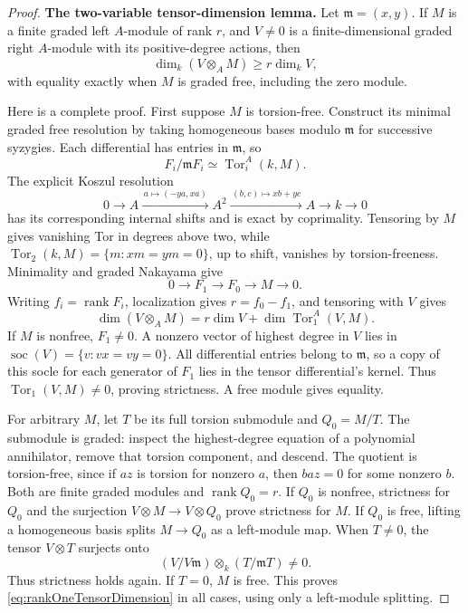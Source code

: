 \documentclass[11pt,a4paper]{article}
\theoremstyle{named}\newtheorem{finding}{Finding}[section]
\theoremstyle{definition}\newtheorem{definition}[finding]{Definition}
\theoremstyle{remark}\newtheorem{remark}[finding]{Remark}
\begin{document}
\begin{proof}
\par\smallskip\noindent\textbf{The two-variable tensor-dimension lemma.}\quad
Let \(\mathfrak m=(x,y)\). If \(M\) is a finite graded
left \(A\)-module of rank \(r\), and \(V\ne0\) is a
finite-dimensional graded right \(A\)-module with its
positive-degree actions, then
\begin{equation}\label{eq:rankOneTensorDimension}
 \dim_k(V\otimes_AM)\ge r\dim_kV,
\end{equation}
with equality exactly when \(M\) is graded free,
including the zero module.

Here is a complete proof. First suppose \(M\) is
torsion-free. Construct its minimal graded free
resolution by taking homogeneous bases modulo
\(\mathfrak m\) for successive syzygies. Each differential
has entries in \(\mathfrak m\), so
\[
 F_i/\mathfrak mF_i\simeq\operatorname{Tor}_i^A(k,M).
\]
The explicit Koszul resolution
\[
 0\longrightarrow A
 \xrightarrow{\,a\mapsto(-ya,xa)\,}A^2
 \xrightarrow{\,(b,c)\mapsto xb+yc\,}A
 \longrightarrow k\longrightarrow0
\]
has its corresponding internal shifts and is exact
by coprimality. Tensoring by \(M\) gives vanishing
Tor in degrees above two, while
\(\operatorname{Tor}_2(k,M)=\{m:xm=ym=0\}\), up to
shift, vanishes by torsion-freeness.
Minimality and graded Nakayama give
\[
 0\longrightarrow F_1\longrightarrow F_0
       \longrightarrow M\longrightarrow0.
\]
Writing \(f_i=\operatorname{rank}F_i\), localization
gives \(r=f_0-f_1\), and tensoring with \(V\) gives
\begin{equation}\label{eq:rankOneTorDimension}
 \dim(V\otimes_AM)
 =r\dim V+\dim\operatorname{Tor}_1^A(V,M).
\end{equation}
If \(M\) is nonfree, \(F_1\ne0\).
A nonzero vector of highest degree in \(V\) lies in
\(\operatorname{soc}(V)=\{v:vx=vy=0\}\).
All differential entries belong to \(\mathfrak m\),
so a copy of this socle for each generator of \(F_1\)
lies in the tensor differential's kernel.
Thus \(\operatorname{Tor}_1(V,M)\ne0\), proving
strictness. A free module gives equality.

For arbitrary \(M\), let \(T\) be its full torsion
submodule and \(Q_0=M/T\). The submodule is graded:
inspect the highest-degree equation of a polynomial
annihilator, remove that torsion component, and descend.
The quotient is torsion-free, since if \(az\) is
torsion for nonzero \(a\), then \(baz=0\) for some
nonzero \(b\). Both are finite graded modules and
\(\operatorname{rank}Q_0=r\).
If \(Q_0\) is nonfree, strictness for \(Q_0\) and
the surjection \(V\otimes M\to V\otimes Q_0\) prove
strictness for \(M\).
If \(Q_0\) is free, lifting a homogeneous basis
splits \(M\to Q_0\) as a left-module map.
When \(T\ne0\), the tensor \(V\otimes T\) surjects onto
\[
 (V/V\mathfrak m)\otimes_k(T/\mathfrak mT)\ne0.
\]
Thus strictness holds again. If \(T=0\), \(M\) is
free. This proves \eqref{eq:rankOneTensorDimension}
in all cases, using only a left-module splitting.


\end{proof}
\end{document}

